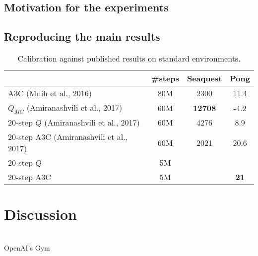 \documentclass{article}
\begin{document}

\subsection{Motivation for the experiments}
\subsection{Reproducing the main results}


\begin{table}
\centering
\label{table1}
\begin{tabular}{@{}l|c|cc}
\toprule
                                             & \#steps & Seaquest       & Pong \\ \midrule
    A3C (Mnih et al., 2016)                  & 80M     & 2300           & 11.4 \\ \midrule
	$Q_{MC}$ (Amiranashvili et al., 2017)    & 60M     & \textbf{12708} & -4.2 \\
	20-step $Q$ (Amiranashvili et al., 2017) & 60M     & 4276           & 8.9  \\
	20-step A3C (Amiranashvili et al., 2017) & 60M     & 2021           & 20.6 \\ \midrule
    20-step $Q$                              & 5M      &                &                 \\  
    20-step A3C                              & 5M      &                & \textbf{21}     \\ \bottomrule
\end{tabular}
\caption{Calibration against published results on standard environments.}
\end{table}

\section{Discussion}


\citet{mnih2015} \\
OpenAI's Gym \citep{gym} \\
\citep{pytorch} \\
\citet{amiranashvili2018analyzing} \\
\citet{pmlr-v48-mniha16}

\pagebreak

\small


\end{document}
